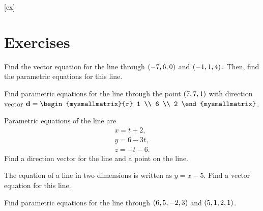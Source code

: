 [ex]
\section*{Exercises}

\begin{enumialphparenastyle}

\begin{ex} 
  Find the vector equation for the line through $\left(-7,6,0\right)$ and
  $\left(-1,1,4\right).$ Then, find the parametric equations for this
  line.
\end{ex}

\begin{ex}
  Find parametric equations for the line through the point
  $\left(7,7,1\right)$ with direction vector
  $\vect{d} = \begin{mysmallmatrix}{r} 1 \\ 6 \\ 2 \end{mysmallmatrix}$.
\end{ex} 

\begin{ex}
  Parametric equations of the line are 
  \begin{equation*}
    \begin{array}{c}
      x = t+2, \\
      y = 6-3t, \\
      z = -t-6.
    \end{array}
  \end{equation*}
  Find a direction vector for the line and a point on the line.
\end{ex} 

\begin{ex}
  The equation of a line in two dimensions is written as $y=x-5.$ Find
  a vector equation for this line.
\end{ex} 

\begin{ex}
  Find parametric equations for the line through $\left(6, 5, -2, 3\right)$
  and $\left(5, 1, 2, 1\right)$.
\end{ex} 


\end{enumialphparenastyle}
